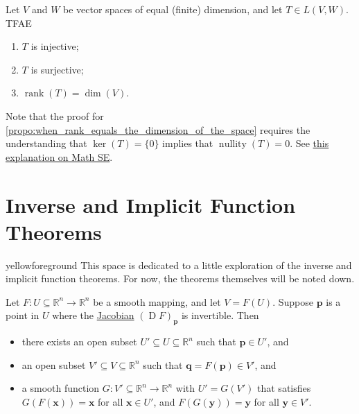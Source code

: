 \documentclass[notoc,notitlepage]{tufte-book}
\DeclareMathOperator{\nullity}{nullity}
\DeclareMathOperator{\rank}{rank}
\DeclareMathOperator{\D}{D}
\begin{document}
\begin{propo}\label{propo:when_rank_equals_the_dimension_of_the_space}
  Let $V$ and $W$ be vector spaces of equal (finite) dimension,
  and let $T \in L(V, W)$. TFAE
  \begin{enumerate}
    \item $T$ is injective;
    \item $T$ is surjective;
    \item $\rank(T) = \dim(V)$.
  \end{enumerate}
\end{propo}

Note that the proof for \cref{propo:when_rank_equals_the_dimension_of_the_space}
requires the understanding that $\ker(T) = \{ 0 \}$ implies that $\nullity(T) = 0$.
See \href{https://math.stackexchange.com/questions/664594/why-mathbf0-has-dimension-zero}{this explanation on Math SE}.


\section{Inverse and Implicit Function Theorems}%
\label{sec:inverse_and_implicit_function_theorems}

\begin{quotebox}{yellow}{foreground}
  This space is dedicated to a little exploration of the inverse and implicit
  function theorems. For now, the theorems themselves will be noted down.
\end{quotebox}

\begin{thm}\label{thm:inverse_function_theorem}
  Let $F : U \subseteq \mathbb{R}^n \to \mathbb{R}^n$ be a smooth mapping, and
  let $V = F(U)$. Suppose $\bm{p}$ is a point in $U$ where the
  \hyperref[defn:differential]{Jacobian} $(\D F)_{\bm{p}}$ is invertible. Then
  \begin{itemize}
    \item there exists an open subset $U' \subseteq U \subseteq \mathbb{R}^n$
      such that $\bm{p} \in U'$, and
    \item an open subset $V' \subseteq V \subseteq \mathbb{R}^n$ such that
      $\bm{q} = F(\bm{p}) \in V'$, and
    \item a smooth function $G : V' \subseteq \mathbb{R}^n \to \mathbb{R}^n$
      with $U' = G(V')$ that satisfies $G(F(\bm{x})) = \bm{x}$ for all $\bm{x}
      \in U'$, and $F(G(\bm{y})) = \bm{y}$ for all $\bm{y} \in V'$.
  \end{itemize}
\end{thm}
\end{document}
